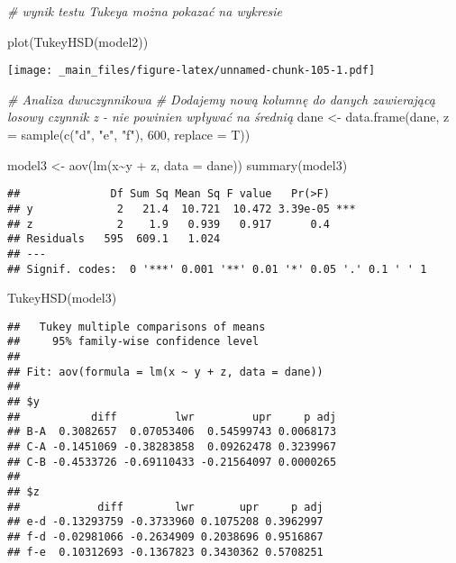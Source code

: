 \documentclass[
]{book}
\newenvironment{Shaded}{\begin{snugshade}}{\end{snugshade}}
\newcommand{\AttributeTok}[1]{\textcolor[rgb]{0.77,0.63,0.00}{#1}}
\newcommand{\CommentTok}[1]{\textcolor[rgb]{0.56,0.35,0.01}{\textit{#1}}}
\newcommand{\DecValTok}[1]{\textcolor[rgb]{0.00,0.00,0.81}{#1}}
\newcommand{\FunctionTok}[1]{\textcolor[rgb]{0.00,0.00,0.00}{#1}}
\newcommand{\NormalTok}[1]{#1}
\newcommand{\OtherTok}[1]{\textcolor[rgb]{0.56,0.35,0.01}{#1}}
\newcommand{\SpecialCharTok}[1]{\textcolor[rgb]{0.00,0.00,0.00}{#1}}
\newcommand{\StringTok}[1]{\textcolor[rgb]{0.31,0.60,0.02}{#1}}
\begin{document}
\begin{Shaded}
\begin{Highlighting}[]
\CommentTok{\# wynik testu Tukeya można pokazać na wykresie}

\FunctionTok{plot}\NormalTok{(}\FunctionTok{TukeyHSD}\NormalTok{(model2))}
\end{Highlighting}
\end{Shaded}

\texttt{[image: \_main\_files/figure-latex/unnamed-chunk-105-1.pdf]}

\begin{Shaded}
\begin{Highlighting}[]
\CommentTok{\# Analiza dwuczynnikowa}
\CommentTok{\# Dodajemy nową kolumnę do danych zawierającą losowy czynnik z {-} nie powinien wpływać na średnią}
\NormalTok{dane }\OtherTok{\textless{}{-}} \FunctionTok{data.frame}\NormalTok{(dane, }\AttributeTok{z =} \FunctionTok{sample}\NormalTok{(}\FunctionTok{c}\NormalTok{(}\StringTok{"d"}\NormalTok{, }\StringTok{"e"}\NormalTok{, }\StringTok{"f"}\NormalTok{), }\DecValTok{600}\NormalTok{, }\AttributeTok{replace =}\NormalTok{ T))}

\NormalTok{model3 }\OtherTok{\textless{}{-}} \FunctionTok{aov}\NormalTok{(}\FunctionTok{lm}\NormalTok{(x}\SpecialCharTok{\textasciitilde{}}\NormalTok{y }\SpecialCharTok{+}\NormalTok{ z, }\AttributeTok{data =}\NormalTok{ dane))}
\FunctionTok{summary}\NormalTok{(model3)}
\end{Highlighting}
\end{Shaded}

\begin{verbatim}
##              Df Sum Sq Mean Sq F value   Pr(>F)    
## y             2   21.4  10.721  10.472 3.39e-05 ***
## z             2    1.9   0.939   0.917      0.4    
## Residuals   595  609.1   1.024                     
## ---
## Signif. codes:  0 '***' 0.001 '**' 0.01 '*' 0.05 '.' 0.1 ' ' 1
\end{verbatim}

\begin{Shaded}
\begin{Highlighting}[]
\FunctionTok{TukeyHSD}\NormalTok{(model3)}
\end{Highlighting}
\end{Shaded}

\begin{verbatim}
##   Tukey multiple comparisons of means
##     95% family-wise confidence level
## 
## Fit: aov(formula = lm(x ~ y + z, data = dane))
## 
## $y
##           diff         lwr         upr     p adj
## B-A  0.3082657  0.07053406  0.54599743 0.0068173
## C-A -0.1451069 -0.38283858  0.09262478 0.3239967
## C-B -0.4533726 -0.69110433 -0.21564097 0.0000265
## 
## $z
##            diff        lwr       upr     p adj
## e-d -0.13293759 -0.3733960 0.1075208 0.3962997
## f-d -0.02981066 -0.2634909 0.2038696 0.9516867
## f-e  0.10312693 -0.1367823 0.3430362 0.5708251
\end{verbatim}
\end{document}
